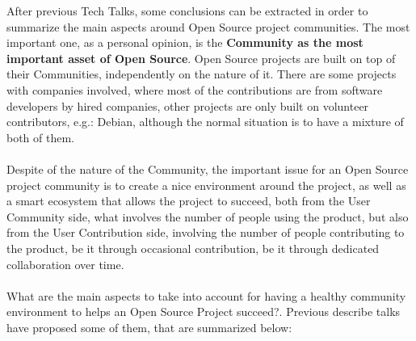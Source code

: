 \documentclass[11pt]{article}
\begin{document}
After previous Tech Talks, some conclusions can be extracted in order to summarize the main aspects around Open Source project communities. The most important one, as a personal opinion, is the \textbf{Community as the most important asset of Open Source}. Open Source projects are built on top of their Communities, independently on the nature of it. There are some projects with companies involved, where most of the contributions are from software developers by hired companies, other projects are only built on volunteer contributors, e.g.: Debian, although the normal situation is to have a mixture of both of them.\\
\\
Despite of the nature of the Community, the important issue for an Open Source project community is to create a nice environment around the project, as well as a smart ecosystem that allows the project to succeed, both from the User Community side, what involves the number of people using the product, but also from the User Contribution side, involving the number of people contributing to the product, be it through occasional contribution, be it through dedicated collaboration over time.\\
\\
What are the main aspects to take into account for having a healthy community environment to helps an Open Source Project succeed?. Previous describe talks have proposed some of them, that are summarized below:
\end{document}
